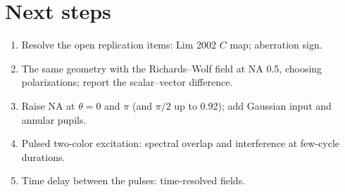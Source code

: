 \documentclass[11pt]{article}
\begin{document}
\section*{Next steps}
\begin{enumerate}
\item Resolve the open replication items: Lim 2002 $C$ map; aberration sign.
\item The same geometry with the Richards--Wolf field at NA 0.5, choosing polarizations; report the
scalar--vector difference.
\item Raise NA at $\theta=0$ and $\pi$ (and $\pi/2$ up to 0.92); add Gaussian input and annular pupils.
\item Pulsed two-color excitation: spectral overlap and interference at few-cycle durations.
\item Time delay between the pulses: time-resolved fields.
\end{enumerate}
\end{document}
